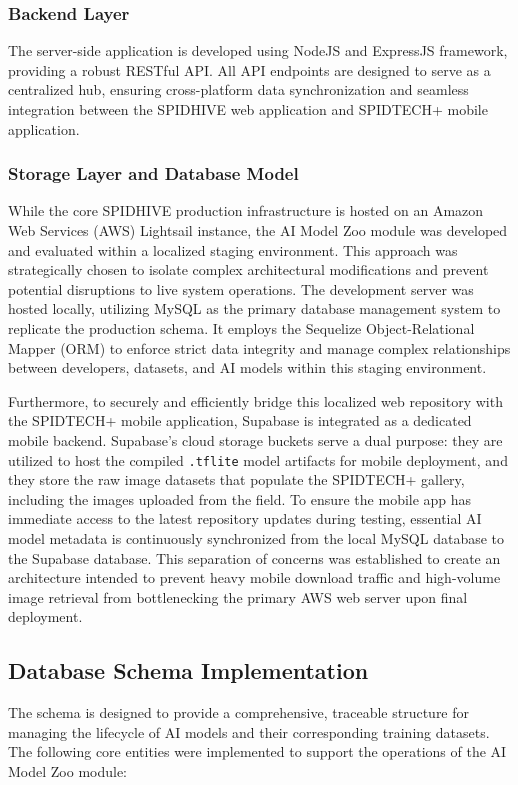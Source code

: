 \documentclass[journal]{./IEEE/IEEEtran}
\begin{document}
\subsubsection{Backend Layer}
The server-side application is developed using NodeJS and ExpressJS framework, providing a robust RESTful API. All API endpoints are designed to serve as a centralized hub, ensuring cross-platform data synchronization and seamless integration between the SPIDHIVE web application and SPIDTECH+ mobile application.

\subsubsection{Storage Layer and Database Model}
While the core SPIDHIVE production infrastructure is hosted on an Amazon Web Services (AWS) Lightsail instance, the AI Model Zoo module was developed and evaluated within a localized staging environment. This approach was strategically chosen to isolate complex architectural modifications and prevent potential disruptions to live system operations. The development server was hosted locally, utilizing MySQL as the primary database management system to replicate the production schema. It employs the Sequelize Object-Relational Mapper (ORM) to enforce strict data integrity and manage complex relationships between developers, datasets, and AI models within this staging environment.

Furthermore, to securely and efficiently bridge this localized web repository with the SPIDTECH+ mobile application, Supabase is integrated as a dedicated mobile backend. Supabase’s cloud storage buckets serve a dual purpose: they are utilized to host the compiled \texttt{.tflite} model artifacts for mobile deployment, and they store the raw image datasets that populate the SPIDTECH+ gallery, including the images uploaded from the field. To ensure the mobile app has immediate access to the latest repository updates during testing, essential AI model metadata is continuously synchronized from the local MySQL database to the Supabase database. This separation of concerns was established to create an architecture intended to prevent heavy mobile download traffic and high-volume image retrieval from bottlenecking the primary AWS web server upon final deployment.

\subsection{Database Schema Implementation}
The schema is designed to provide a comprehensive, traceable structure for managing the lifecycle of AI models and their corresponding training datasets. The following core entities were implemented to support the operations of the AI Model Zoo module:
\end{document}
